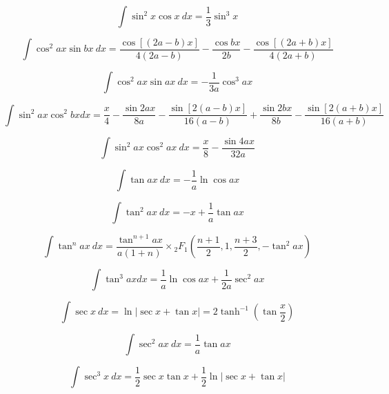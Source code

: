 \begin{equation}
\int \sin^2 x \cos x\ dx = \frac{1}{3} \sin^3 x
\end{equation}

\begin{equation}
\int \cos^2 ax \sin bx\ dx = \frac{\cos[(2a-b)x]}{4(2a-b)} 
- \frac{\cos bx}{2b}
 - \frac{\cos[(2a+b)x]}{4(2a+b)}
\end{equation}

\begin{equation}
\int \cos^2 ax \sin ax\ dx = -\frac{1}{3a}\cos^3{ax} 
\end{equation}

\begin{equation}
\int \sin^2 ax \cos^2 bx dx = \frac{x}{4}
-\frac{\sin 2ax}{8a}-
\frac{\sin[2(a-b)x]}{16(a-b)}
+\frac{\sin 2bx}{8b}-
\frac{\sin[2(a+b)x]}{16(a+b)}
\end{equation}

\begin{equation}
\int \sin^2 ax \cos^2 ax\ dx = \frac{x}{8}-\frac{\sin 4ax}{32a}
\end{equation}

\begin{equation}
\int \tan ax\ dx = -\frac{1}{a} \ln \cos ax 
\end{equation}

\begin{equation}
\int \tan^2 ax\ dx = -x + \frac{1}{a} \tan ax 
\end{equation}

\begin{equation}
\int \tan^n ax\ dx = 
\frac{\tan^{n+1} ax }{a(1+n)} \times
 {_2}F_1\left( \frac{n+1}{2}, 
1, \frac{n+3}{2}, -\tan^2 ax \right) 
\end{equation}

\begin{equation}
\int \tan^3 ax dx = \frac{1}{a} \ln \cos ax + \frac{1}{2a}\sec^2 ax 
\end{equation}

\begin{equation}
\int \sec x \ dx = \ln | \sec x + \tan x | = 2 \tanh^{-1} \left (\tan \frac{x}{2} \right) 
\end{equation}

\begin{equation}
\int \sec^2 ax\ dx = \frac{1}{a} \tan ax 
\end{equation}

\begin{equation}\label{eq:Kloeppel}
\int \sec^3 x \ {dx} = \frac{1}{2} \sec x \tan x + \frac{1}{2}\ln | \sec x + \tan x |
\end{equation}

